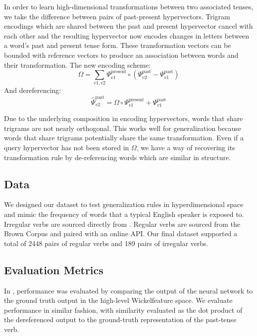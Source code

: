 \documentclass{article}
\begin{document}
In order to learn high-dimensional transformations between two associated tenses, we take the difference between pairs of past-present hypervectors. Trigram encodings which are shared between the past and present hypervector cancel with each other and the resulting hypervector now encodes changes in letters between a word's past and present tense form. These transformation vectors can be bounded with reference vectors to produce an association between words and their transformation. The new encoding scheme:
 \begin{equation}
 \label{eq:diff_wickel_ref}
 \Omega =  \sum_{v1, v2} \Psi^{\text{present}}_{v1} \circ (\Psi^{\text{past}}_{v2} - \Psi^{\text{past}}_{v1})
 \end{equation}
 And dereferencing:
 \begin{equation}
 \label{eq:diff_wickel_deref}
 \hat{\Psi}^{\text{past}}_{v2} = \Omega \circ \Psi^{\text{present}}_{v1} + \Psi^{\text{past}}_{v1}
 \end{equation}
 
Due to the underlying composition in encoding hypervectors, words that share trigrams are not nearly orthogonal. This works well for generalization because words that share trigrams potentially share the same transformation. Even if a query hypervector has not been stored in $\Omega$, we have a way of recovering its transformation rule by de-referencing words which are similar in structure.

\subsection{Data}
We designed our dataset to test generalization rules in hyperdimensional space and mimic the frequency of words that a typical English speaker is exposed to. Irregular verbs are sourced directly from \citet{Rumelhart1986a}. Regular verbs are sourced from the Brown Corpus and paired with an online API. Our final dataset supported a total of 2448 pairs of regular verbs and 189 pairs of irregular verbs. 
    
\subsection{Evaluation Metrics}

In \citet{Rumelhart1986a}, performance was evaluated by comparing the output of the neural network to the ground truth output in the high-level Wickelfeature space. We evaluate performance in similar fashion, with similarity evaluated as the dot product of the dereferenced output to the ground-truth representation of the past-tense verb. 
\end{document}
